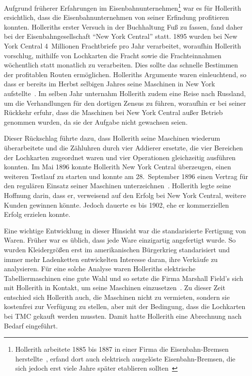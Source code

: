 \documentclass[parskip=half]{scrartcl}
\begin{document}
Aufgrund früherer Erfahrungen im Eisenbahnunternehmen\footnote{Hollerith
arbeitete 1885 bis 1887 in einer Firma die Eisenbahn-Bremsen
herstellte~\cite{heide2009punched}, erfand dort auch elektrisch
ausgelöste Eisenbahn-Bremsen, die sich jedoch erst viele Jahre später
etablieren sollten~\cite{austrian1982herman}} war es für Hollerith ersichtlich,
dass die Eisenbahnunternehmen von seiner Erfindung profitieren konnten.
Holleriths erster Versuch in der Buchhaltung Fuß zu fassen, fand daher bei der
Eisenbahngesellschaft \enquote{New York Central} statt. 1895 wurden bei New
York Central 4~Millionen Frachtbriefe pro Jahr verarbeitet, woraufhin Hollerith
vorschlug, mithilfe von Lochkarten die Fracht sowie die Frachteinnahmen
wöchentlich statt monatlich zu verarbeiten. Dies sollte das schnelle Bestimmen
der profitablen Routen ermöglichen. Holleriths Argumente waren einleuchtend, so
dass er bereits im Herbst selbigen Jahres seine Maschinen in New York
aufstellte~\cite{austrian1982herman}. Im selben Jahr unternahm Hollerith zudem
eine Reise nach Russland, um die Verhandlungen für den dortigen Zensus zu
führen, woraufhin er bei seiner Rückkehr erfuhr, dass die Maschinen bei New
York Central außer Betrieb genommen wurden, da sie der Aufgabe nicht gewachsen
seien.

Dieser Rückschlag führte dazu, dass Hollerith seine Maschinen wiederum
überarbeitete und die Zähluhren durch vier Addierer ersetzte, die vier
Bereichen der Lochkarten zugeordnet waren und vier Operationen gleichzeitig
ausführen konnten. Im Mai 1896 konnte Hollerith New York Central überzeugen,
einen weiteren Testlauf zu starten und konnte am 28.~September 1896 einen
Vertrag für den regulären Einsatz seiner Maschinen
unterzeichnen~\cite{austrian1982herman}. Hollerith legte seine Hoffnung darin,
dass er, verweisend auf den Erfolg bei New York Central, weitere Kunden
gewinnen könnte. Jedoch dauerte es bis 1902, ehe er kommerziellen Erfolg
erzielen konnte.

Eine wichtige Entwicklung in dieser Hinsicht war die standarisierte Fertigung
von Waren. Früher war es üblich, dass jede Ware einzigartig angefertigt wurde.
So wurden Kleidergrößen erst im amerikanischen Bürgerkrieg standarisiert und
immer mehr Ladenketten entwickelten Interesse daran, ihre Verkäufe zu
analysieren. Für eine solche Analyse waren Holleriths elektrische
Tabelliermaschinen eine gute Wahl und so setzte die Firma Marshall Field's sich
mit Hollerith in Kontakt, um seine Maschinen
einzusetzen~\cite{austrian1982herman}. Zu dieser Zeit entschied sich Hollerith
auch, die Maschinen nicht zu vermieten, sondern sie kostenfrei zur Verfügung zu
stellen, aber mit der Bedingung, dass die Lochkarten bei TMC gekauft werden
mussten. Damit hatte Hollerith eine Abrechnung nach Bedarf eingeführt.
\end{document}
